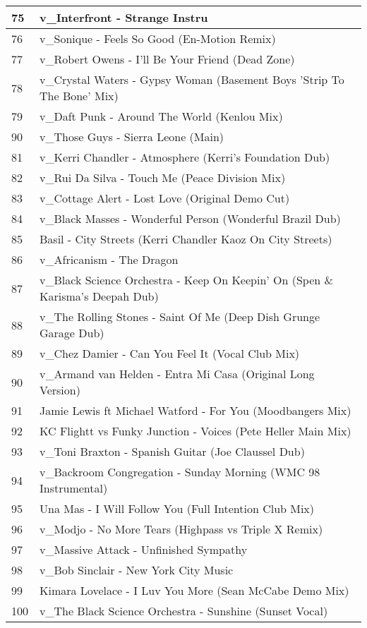 \begin{appendices}
\begin{longtable}{| p{} | p{} |}
\hline
75 & v{\_}Interfront - Strange Instru\\
\hline
76 & v{\_}Sonique - Feels So Good (En-Motion Remix)\\
\hline
77 & v{\_}Robert Owens - I'll Be Your Friend (Dead Zone)\\
\hline
78 & v{\_}Crystal Waters - Gypsy Woman (Basement Boys 'Strip To The Bone' Mix)\\
\hline
79 & v{\_}Daft Punk - Around The World (Kenlou Mix)\\
\hline
90 & v{\_}Those Guys - Sierra Leone (Main)\\
\hline
81 & v{\_}Kerri Chandler - Atmosphere (Kerri's Foundation Dub)\\
\hline
82 & v{\_}Rui Da Silva - Touch Me (Peace Division Mix)\\
\hline
83 & v{\_}Cottage Alert - Lost Love (Original Demo Cut)\\
\hline
84 & v{\_}Black Masses - Wonderful Person (Wonderful Brazil Dub)\\
\hline
85 & Basil - City Streets (Kerri Chandler Kaoz On City Streets)\\
\hline
86 & v{\_}Africanism - The Dragon\\
\hline
87 & v{\_}Black Science Orchestra - Keep On Keepin' On (Spen {\&} Karisma's Deepah Dub)\\
\hline
88 & v{\_}The Rolling Stones - Saint Of Me (Deep Dish Grunge Garage Dub)\\
\hline
89 & v{\_}Chez Damier - Can You Feel It (Vocal Club Mix)\\
\hline 
90 & v{\_}Armand van Helden - Entra Mi Casa (Original Long Version)\\
\hline
91 & Jamie Lewis ft Michael Watford - For You (Moodbangers Mix)\\
\hline 
92 & KC Flightt vs Funky Junction - Voices (Pete Heller Main Mix)\\
\hline
93 & v{\_}Toni Braxton - Spanish Guitar (Joe Claussel Dub)\\
\hline 
94 & v{\_}Backroom Congregation - Sunday Morning (WMC 98 Instrumental)\\
\hline
95 & Una Mas - I Will Follow You (Full Intention Club Mix)\\
\hline
96 & v{\_}Modjo - No More Tears (Highpass vs Triple X Remix)\\
\hline
97 & v{\_}Massive Attack - Unfinished Sympathy\\
\hline
98 & v{\_}Bob Sinclair - New York City Music\\
\hline
99 & Kimara Lovelace - I Luv You More (Sean McCabe Demo Mix)\\
\hline
100 & v{\_}The Black Science Orchestra - Sunshine (Sunset Vocal)\\
\hline
\end{longtable}

\end{appendices}
